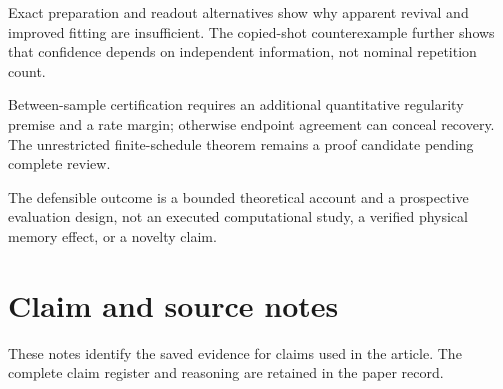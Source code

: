 \documentclass[11pt]{article}
\begin{document}
Exact preparation and readout alternatives show why apparent revival and improved fitting are insufficient. The copied-shot counterexample further shows that confidence depends on independent information, not nominal repetition count.

Between-sample certification requires an additional quantitative regularity premise and a rate margin; otherwise endpoint agreement can conceal recovery. The unrestricted finite-schedule theorem remains a proof candidate pending complete review.

The defensible outcome is a bounded theoretical account and a prospective evaluation design, not an executed computational study, a verified physical memory effect, or a novelty claim.

\section*{Claim and source notes}
These notes identify the saved evidence for claims used in the article. The complete claim register and reasoning are retained in the paper record.
\end{document}
